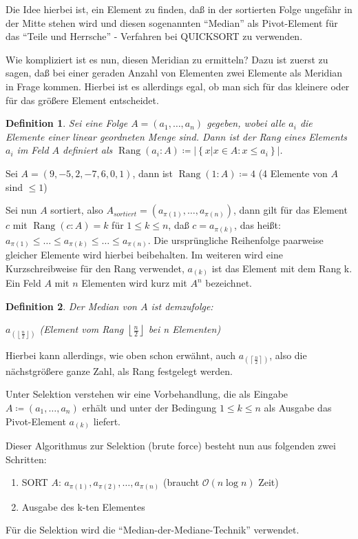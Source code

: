\documentclass[ngerman,draft,parskip=half*,twoside]{scrreprt}
\theoremstyle{break}
\newtheorem{definition}{Definition}[chapter]
\theoremstyle{nonumberbreak}
\newcommand*{\OO}{\mathcal{O}}      %
\DeclareMathOperator{\rg}{Rang}     %
\begin{document}
 Die Idee hierbei ist, ein Element zu finden, daß in der sortierten Folge ungefähr in der Mitte stehen wird und diesen sogenannten
 "`Median"' als Pivot-Element für das "`Teile und Herrsche"' - Verfahren bei \textsc{QUICKSORT} zu verwenden.

 Wie kompliziert ist es nun, diesen Meridian zu ermitteln? Dazu ist zuerst zu sagen, daß bei einer geraden Anzahl von Elementen zwei
 Elemente als Meridian in Frage kommen. Hierbei ist es allerdings egal, ob man sich für das kleinere oder für das größere Element
 entscheidet.

\begin{definition}
 Sei eine Folge $A=(a_{1}, \ldots , a_{n})$ gegeben, wobei alle $a_{i}$ die Elemente einer linear geordneten Menge sind. 
 Dann ist der Rang eines Elements $a_i$ im Feld $A$ definiert als $\rg(a_{i}:A)\coloneqq \left|\left\{x|x \in A:x\leq a_{i}\right\}\right|$.
\end{definition}

 Sei $A=(9,-5,2,-7,6,0,1)$, dann ist $\rg(1:A)\coloneqq 4$ (4 Elemente von $A$ sind $\leq 1$)


Sei nun $A$ sortiert, also $A_{sortiert}=(a_{\pi(1)}, \ldots , a_{\pi(n)})$, dann gilt für das Element $c$ mit $\rg(c:A)=k$ für $1\leq k
\leq n$, daß $c=a_{\pi(k)}$, das heißt:
$a_{\pi(1)}\leq \ldots \leq a_{\pi(k)}\leq \ldots \leq a_{\pi(n)}$.
Die ursprüngliche Reihenfolge paarweise gleicher Elemente wird hierbei beibehalten. Im weiteren wird
eine Kurzschreibweise für den Rang verwendet, $a_{(k)}$ ist das Element mit dem Rang k. Ein Feld $A$ mit $n$ Elementen wird kurz mit $A^n$
bezeichnet.

\begin{definition}
Der Median von $A$ ist demzufolge:

$a_{\left(\left\lfloor \frac{n}{2}\right\rfloor\right)}$ (Element vom Rang $\left\lfloor \frac{n}{2}\right\rfloor$ bei n Elementen)
\end{definition}

Hierbei kann allerdings, wie oben schon erwähnt, auch $a_{\left(\left\lceil \frac{n}{2}\right\rceil\right)}$, also die nächstgrößere
ganze Zahl, als Rang festgelegt werden.

Unter Selektion verstehen wir eine Vorbehandlung, die als Eingabe 
$A\coloneqq (a_{1}, \ldots , a_{n})$ erhält und unter der Bedingung $1\leq k\leq n$ als Ausgabe das Pivot-Element $a_{(k)}$ liefert.

 Dieser Algorithmus zur Selektion (brute force) besteht nun aus folgenden zwei Schritten:
 \begin{enumerate}
	\item SORT $A$: $a_{\pi(1)}, a_{\pi(2)}, \ldots , a_{\pi(n)}$ (braucht $\OO(n \log n)$ Zeit)
	\item Ausgabe des k-ten Elementes
 \end{enumerate}
 Für die Selektion wird die "`Median-der-Mediane-Technik"' verwendet. 
\end{document}
